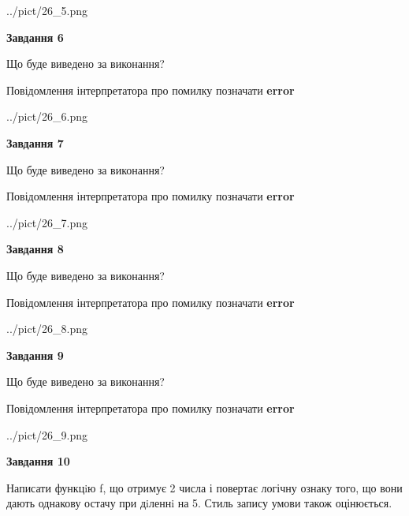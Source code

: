 \documentclass[12pt, ukrainian]{article}
\begin{document}
{\begin {large}
\begin{center}
	{../pict/26_5.png}
\end{center}
\newpage

{\begin {center}\textbf{Завдання 6}\end {center}}\par
Що буде виведено за виконання? \par
Повідомлення інтерпретатора про помилку позначати \textbf{error}

\begin{center}
	{../pict/26_6.png}
\end{center}
\newpage

{\begin {center}\textbf{Завдання 7}\end {center}}\par
Що буде виведено за виконання? \par
Повідомлення інтерпретатора про помилку позначати \textbf{error}

\begin{center}
	{../pict/26_7.png}
\end{center}
\newpage

{\begin {center}\textbf{Завдання 8}\end {center}}\par
Що буде виведено за виконання? \par
Повідомлення інтерпретатора про помилку позначати \textbf{error}

\begin{center}
	{../pict/26_8.png}
\end{center}
\newpage

{\begin {center}\textbf{Завдання 9}\end {center}}\par
Що буде виведено за виконання? \par
Повідомлення інтерпретатора про помилку позначати \textbf{error}

\begin{center}
	{../pict/26_9.png}
\end{center}
\newpage

{\begin {center}\textbf{Завдання 10}\end {center}}\par

Написати функцiю f, що отримує 2 числа і повертає логічну ознаку того, що вони дають однакову остачу при дiленнi на 5. Стиль запису умови також оцінюється.\par
\newpage

\end {large}}
\end{document}
